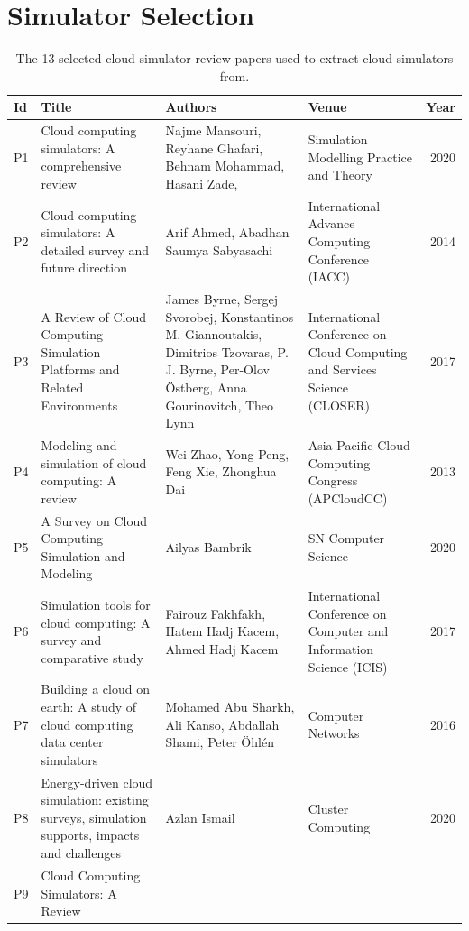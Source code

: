 \section{Simulator Selection}
\begin{table}[ht]
\caption{The 13 selected cloud simulator review papers used to extract cloud simulators from.}
\label{tab:papersAppendix}
\begin{tabularx}{\textwidth}{l>{\raggedright\arraybackslash}X>{\raggedright\arraybackslash}X>{\raggedright\arraybackslash}Xr}
\textbf{Id} &
  \textbf{Title} &
  \textbf{Authors} &
  \textbf{Venue} &
  \textbf{Year} \\ \hline
P1 &
  Cloud computing simulators: A comprehensive review &
  Najme Mansouri, Reyhane Ghafari, Behnam Mohammad, Hasani Zade, &
  Simulation Modelling Practice and Theory &
  2020 \\ \hline
P2 &
  Cloud computing simulators: A detailed survey and future direction &
  Arif Ahmed, Abadhan Saumya Sabyasachi &
  International Advance Computing Conference (IACC) &
  2014 \\ \hline
P3 &
  A Review of Cloud Computing Simulation Platforms and Related Environments &
  James Byrne, Sergej Svorobej, Konstantinos M. Giannoutakis, Dimitrios Tzovaras, P. J. Byrne, Per-Olov Östberg, Anna Gourinovitch, Theo Lynn &
  International Conference on Cloud Computing and Services Science (CLOSER) &
  2017 \\ \hline
P4 &
  Modeling and simulation of cloud computing: A review &
  Wei Zhao, Yong Peng, Feng Xie, Zhonghua Dai &
  Asia Pacific Cloud Computing Congress (APCloudCC) &
  2013 \\ \hline
P5 &
  A Survey on Cloud Computing Simulation and Modeling &
  Ailyas Bambrik &
  SN Computer Science &
  2020 \\ \hline
P6 &
  Simulation tools for cloud computing: A survey and comparative study &
  Fairouz Fakhfakh, Hatem Hadj Kacem, Ahmed Hadj Kacem &
  International Conference on Computer and Information Science (ICIS) &
  2017 \\ \hline
P7 &
  Building a cloud on earth: A study of cloud computing data center simulators &
  Mohamed Abu Sharkh, Ali Kanso, Abdallah Shami, Peter Öhlén &
  Computer Networks &
  2016 \\ \hline
P8 &
  Energy-driven cloud simulation: existing surveys, simulation supports, impacts and challenges &
  Azlan Ismail &
  Cluster Computing &
  2020 \\ \hline
P9 &
  Cloud Computing Simulators: A Review &

\end{tabularx}
\end{table}
